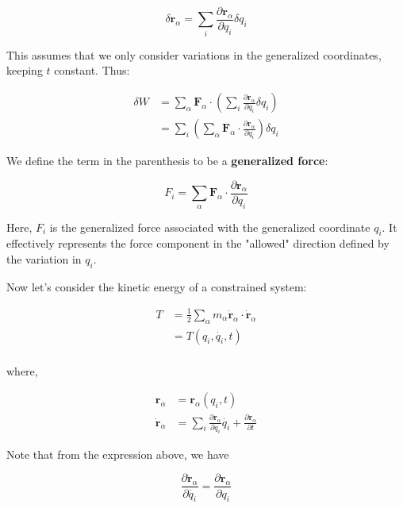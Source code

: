 \begin{equation}
    \delta \mathbf{r}_\alpha = \sum_{i} \frac{\partial \mathbf{r}_\alpha}{\partial q_i} \delta q_i
\end{equation}

This assumes that we only consider variations in the generalized coordinates, keeping 
$t$ constant. Thus:

\begin{align*}
    \delta W &= \sum_{\alpha} \mathbf{F}_\alpha \cdot \left(\sum_{i} \frac{\partial \mathbf{r}_\alpha}{\partial q_i} \delta q_i \right) \\
             &= \sum_{i} \left(\sum_{\alpha} \mathbf{F}_{\alpha} \cdot \frac{ \partial \mathbf{r}_\alpha}{\partial q_i} \right) \delta q_i
\end{align*}

We define the term in the parenthesis to be a \textbf{generalized force}:

\[
    F_i = \sum_{\alpha} \mathbf{F}_{\alpha} \cdot \frac{\partial \mathbf{r}_\alpha}{\partial q_i}
\]

Here, $F_i$ is the generalized force associated with the generalized coordinate $q_i$. It effectively represents the force component in the "allowed" direction defined by the variation in $q_i$.

Now let's consider the kinetic energy of a constrained system:

\begin{align*}
    T &= \frac{1}{2} \sum_{\alpha} m_\alpha \dot{\mathbf{r}}_\alpha \cdot \dot{\mathbf{r}}_\alpha \\
      &= T(q_i, \dot{q_i}, t) \\
\end{align*}

where,

\begin{align*}
    \mathbf{r}_\alpha &= \mathbf{r}_\alpha(q_i, t) \\
    \dot{\mathbf{r}}_\alpha &= \sum_i \frac{\partial \mathbf{r}_\alpha}{\partial q_i} \dot{q_i} + \frac{\partial \mathbf{r}_\alpha}{\partial t}
\end{align*}

Note that from the expression above, we have

\begin{equation}
    \frac{\partial \dot{\mathbf{r}}_\alpha}{\partial \dot{q_i}} = \frac{\partial \mathbf{r}_\alpha}{\partial q_i}
\end{equation}

